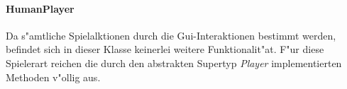 \paragraph{HumanPlayer}
\label{par:humanPlayer}
Da s"amtliche Spielalktionen durch die Gui-Interaktionen bestimmt werden, befindet sich in dieser Klasse keinerlei weitere Funktionalit"at. F"ur diese Spielerart reichen die durch den abstrakten Supertyp \emph{Player} implementierten Methoden v"ollig aus. 